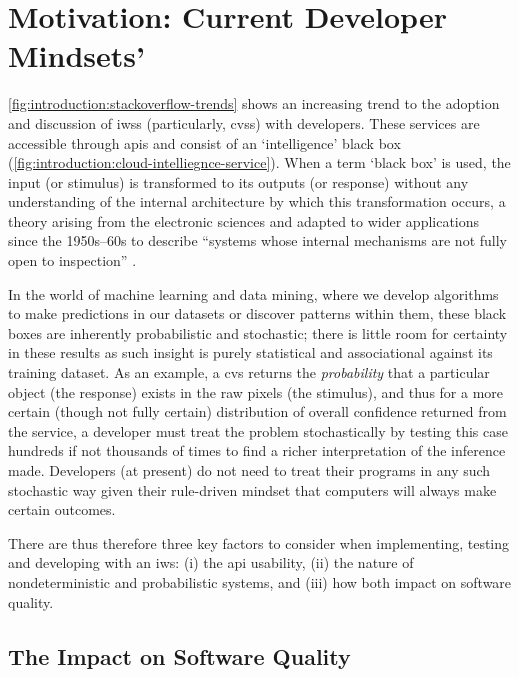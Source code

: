 \section{Motivation: Current Developer Mindsets'}
\label{sec:introduction:motivation}

\cref{fig:introduction:stackoverflow-trends} shows an increasing trend to the adoption and discussion of \glspl{iws} (particularly, \glspl{cvs}) with developers. These services are accessible through \glspl{api} and consist of an `intelligence' black box (\cref{fig:introduction:cloud-intelliegnce-service}). When a term `black box' is used, the input (or stimulus) is transformed to its outputs (or response) without any understanding of the internal architecture by which this transformation occurs, a theory arising from the electronic sciences and adapted to wider applications since the 1950s--60s \citep{Ashby:1957db,Bunge:1963jm} to describe ``systems whose internal mechanisms are not fully open to inspection'' \citep{Ashby:1957db}. 

In the world of machine learning and data mining, where we develop algorithms to make predictions in our datasets or discover patterns within them, these black boxes are inherently probabilistic and stochastic; there is little room for certainty in these results as such insight is purely statistical and associational \citep{Pearl:2018uv} against its training dataset. As an example, a \gls{cvs} returns the \textit{probability} that a particular object (the response) exists in the raw pixels (the stimulus), and thus for a more certain (though not fully certain) distribution of overall confidence returned from the service, a developer must treat the problem stochastically by testing this case hundreds if not thousands of times to find a richer interpretation of the inference made. Developers (at present) do not need to treat their programs in any such stochastic way given their rule-driven mindset that computers will always make certain outcomes.

There are thus therefore three key factors to consider when implementing, testing and developing with an \gls{iws}: (i) the \gls{api} usability, (ii) the nature of nondeterministic and probabilistic systems, and (iii) how both impact on software quality.

\subsection{The Impact on Software Quality}
\label{ssec:introduction:motivation:impact}

